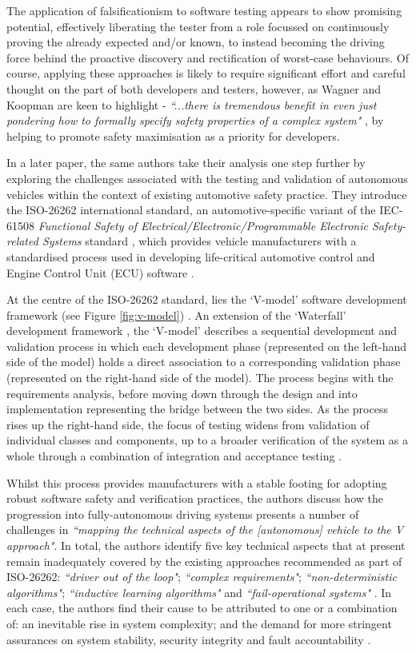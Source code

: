 \documentclass[conference]{IEEEtran}
\begin{document}
The application of falsificationism to software testing appears to show promising potential, effectively liberating the tester from a role focussed on continuously proving the already expected and/or known, to instead becoming the driving force behind the proactive discovery and rectification of worst-case behaviours. Of course, applying these approaches is likely to require significant effort and careful thought on the part of both developers and testers, however, as Wagner and Koopman are keen to highlight - \textit{``...there is tremendous benefit in even just pondering how to formally specify safety properties of a complex system"} \cite{wagner-1}, by helping to promote safety maximisation as a priority for developers.

In a later paper, the same authors take their analysis one step further by exploring the challenges associated with the testing and validation of autonomous vehicles within the context of existing automotive safety practice. They introduce the ISO-26262 international standard, an automotive-specific variant of the IEC-61508 \textit{Functional Safety of Electrical/Electronic/Programmable Electronic Safety-related Systems} standard \cite{iec-61508}, which provides vehicle manufacturers with a standardised process used in developing life-critical automotive control and Engine Control Unit (ECU) software \cite{iso-26262}. 

At the centre of the ISO-26262 standard, lies the `V-model' software development framework (see Figure \ref{fig:v-model}) \cite{iso-26262}. An extension of the `Waterfall' development framework \cite{waterfall}, the `V-model' describes a sequential development and validation process in which each development phase (represented on the left-hand side of the model) holds a direct association to a corresponding validation phase (represented on the right-hand side of the model). The process begins with the requirements analysis, before moving down through the design and into implementation representing the bridge between the two sides. As the process rises up the right-hand side, the focus of testing widens from validation of individual classes and components, up to a broader verification of the system as a whole through a combination of integration and acceptance testing \cite{v-model}. 

Whilst this process provides manufacturers with a stable footing for adopting robust software safety and verification practices, the authors discuss how the progression into fully-autonomous driving systems presents a number of challenges in \textit{``mapping the technical aspects of the [autonomous] vehicle to the V approach"}. In total, the authors identify five key technical aspects that at present remain inadequately covered by the existing approaches recommended as part of ISO-26262: \textit{``driver out of the loop"}; \textit{``complex requirements"}; \textit{``non-deterministic algorithms"}; \textit{``inductive learning algorithms"} and \textit{``fail-operational systems"} \cite{wagner-2}. In each case, the authors find their cause to be attributed to one or a combination of: an inevitable rise in system complexity; and the demand for more stringent assurances on system stability, security integrity and fault accountability \cite{wagner-2}. 
\end{document}
